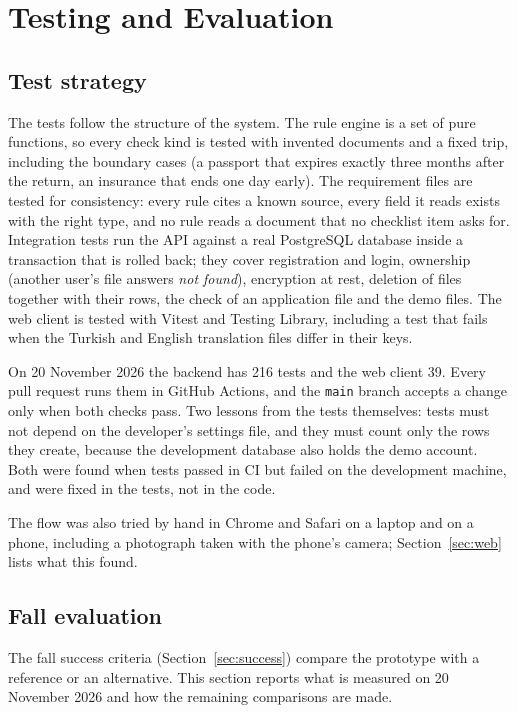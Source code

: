 \chapter{Testing and Evaluation}\label{ch:evaluation}

\section{Test strategy}
The tests follow the structure of the system. The rule engine is a set of pure functions, so every
check kind is tested with invented documents and a fixed trip, including the boundary cases (a
passport that expires exactly three months after the return, an insurance that ends one day
early). The requirement files are tested for consistency: every rule cites a known source, every
field it reads exists with the right type, and no rule reads a document that no checklist item
asks for. Integration tests run the API against a real PostgreSQL database inside a transaction
that is rolled back; they cover registration and login, ownership (another user's file answers
\emph{not found}), encryption at rest, deletion of files together with their rows, the check of an
application file and the demo files. The web client is tested with Vitest and Testing Library,
including a test that fails when the Turkish and English translation files differ in their keys.

On 20 November 2026 the backend has 216 tests and the web client 39. Every pull request runs them
in GitHub Actions, and the \texttt{main} branch accepts a change only when both checks pass. Two
lessons from the tests themselves: tests must not depend on the developer's settings file, and
they must count only the rows they create, because the development database also holds the demo
account. Both were found when tests passed in CI but failed on the development machine, and were
fixed in the tests, not in the code.

The flow was also tried by hand in Chrome and Safari on a laptop and on a phone, including a
photograph taken with the phone's camera; Section~\ref{sec:web} lists what this found.

\section{Fall evaluation}
The fall success criteria (Section~\ref{sec:success}) compare the prototype with a reference or an
alternative. This section reports what is measured on 20 November 2026 and how the remaining
comparisons are made.

